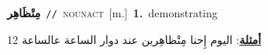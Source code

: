 \documentclass[10pt,a4paper,twoside]{article} %
\begin{document}
\begin{multicols}{2}
{\setlength\topsep{0pt}\textbf{\foreignlanguage{arabic}{مِتْظَاهِر}}\ {\color{gray}\texttt{//}\color{black}}\ \textsc{noun\textunderscore act}\ [m.]\ \textbf{1.}~demonstrating\  \begin{flushright}\color{gray}\foreignlanguage{arabic}{\textbf{\underline{\foreignlanguage{arabic}{أمثلة}}}: اليوم إِحنا مِتْظاهِرين عند دوار الساعة عالساعة 12}\end{flushright}\color{black}} \vspace{2mm}

\end{multicols}
\end{document}
